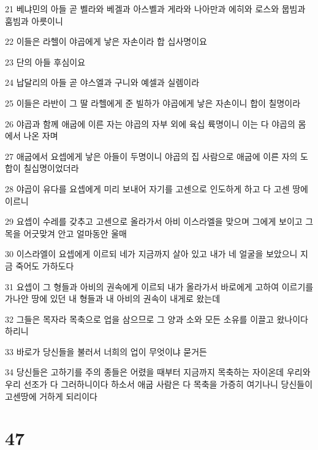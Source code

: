\par 21 베냐민의 아들 곧 벨라와 베겔과 아스벨과 게라와 나아만과 에히와 로스와 뭅빔과 훔빔과 아릇이니
\par 22 이들은 라헬이 야곱에게 낳은 자손이라 합 십사명이요
\par 23 단의 아들 후심이요
\par 24 납달리의 아들 곧 야스엘과 구니와 예셀과 실렘이라
\par 25 이들은 라반이 그 딸 라헬에게 준 빌하가 야곱에게 낳은 자손이니 합이 칠명이라
\par 26 야곱과 함께 애굽에 이른 자는 야곱의 자부 외에 육십 륙명이니 이는 다 야곱의 몸에서 나온 자며
\par 27 애굽에서 요셉에게 낳은 아들이 두명이니 야곱의 집 사람으로 애굽에 이른 자의 도합이 칠십명이었더라
\par 28 야곱이 유다를 요셉에게 미리 보내어 자기를 고센으로 인도하게 하고 다 고센 땅에 이르니
\par 29 요셉이 수레를 갖추고 고센으로 올라가서 아비 이스라엘을 맞으며 그에게 보이고 그 목을 어긋맞겨 안고 얼마동안 울매
\par 30 이스라엘이 요셉에게 이르되 네가 지금까지 살아 있고 내가 네 얼굴을 보았으니 지금 죽어도 가하도다
\par 31 요셉이 그 형들과 아비의 권속에게 이르되 내가 올라가서 바로에게 고하여 이르기를 가나안 땅에 있던 내 형들과 내 아비의 권속이 내게로 왔는데
\par 32 그들은 목자라 목축으로 업을 삼으므로 그 양과 소와 모든 소유를 이끌고 왔나이다 하리니
\par 33 바로가 당신들을 불러서 너희의 업이 무엇이냐 묻거든
\par 34 당신들은 고하기를 주의 종들은 어렸을 때부터 지금까지 목축하는 자이온데 우리와 우리 선조가 다 그러하니이다 하소서 애굽 사람은 다 목축을 가증히 여기나니 당신들이 고센땅에 거하게 되리이다

\chapter{47}

